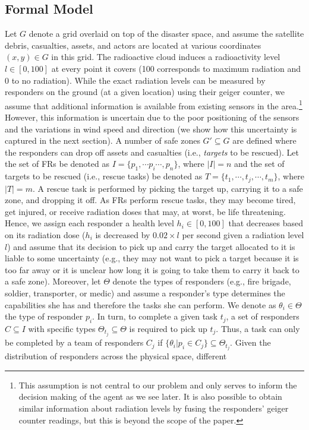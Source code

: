
\subsection{Formal Model}\label{sec:model}
\noindent Let $G$ denote a grid overlaid on top of the disaster space, and assume the satellite debris, casualties, assets, and actors are located at various coordinates $(x,y) \in G$ in this grid. The radioactive cloud induces a radioactivity level  $l \in [0,100]$ at every point it covers (100 corresponds to maximum radiation and 0 to no radiation). While the exact radiation levels can be measured by responders on the ground (at a given location) using their geiger counter, we assume that additional information is available  from existing sensors  in the area.\footnote{This assumption is not central to our problem and only serves to inform the decision making of the agent as we see later. It is also possible to obtain similar information about radiation levels by fusing the responders' geiger counter readings, but this is beyond the scope of the paper.} However, this information is uncertain due to the poor positioning of the sensors and the variations in wind speed and direction (we show how this uncertainty is captured in the next section). A number of safe zones $G' \subseteq G$ are defined where the responders can drop off assets and casualties (i.e., \emph{targets} to be rescued). Let the set of FRs be denoted as $I = \{p_1, \cdots p_i \cdots, p_n\}$, where $|I| = n$ and the set of  targets to be rescued (i.e., rescue tasks) be denoted as  $T = \{t_1,\cdots, t_j, \cdots, t_m\}$, where $|T| = m$. A rescue task is performed by picking the target up, carrying it to a safe zone, and dropping it off.  As FRs perform rescue tasks, they may become tired, get injured, or receive radiation doses that may, at worst, be life threatening. Hence, we assign each responder  a health level $h_i\in [0,100]$ that decreases based on its radiation dose ($h_i$ is decreased by $0.02 \times l$ per second given a radiation level $l$) and assume that its decision to pick up and carry the target allocated to it is liable to some uncertainty (e.g., they may not want to pick a target because it is too far away or it is unclear how long it is going to take them to  carry it back  to a safe zone).  Moreover, let $\Theta$ denote the types of responders (e.g., fire brigade, soldier, transporter, or medic)  and assume a responder's type determines the capabilities  she has and therefore the tasks  she can perform. We denote as $\theta_i \in \Theta$ the type of responder $p_i$. In turn, to complete a given task $t_j$,  a set of responders $C \subseteq I$ with specific types $\Theta_{t_j} \subseteq \Theta$ is required to pick up $t_j$. Thus, a task can only be completed by a team of responders $C_j$ if $\{\theta_i | p_i \in C_j\} \subseteq \Theta_{t_j}$. Given the distribution of responders across the physical space, different 